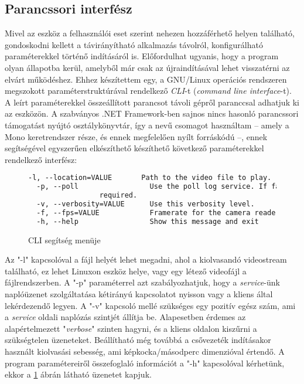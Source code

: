 \subsection{Parancssori interfész}

Mivel az eszköz a felhasználói eset szerint nehezen hozzáférhető helyen található, gondoskodni kellett a távirányítható alkalmazás távolról, konfigurálható paraméterekkel történő indításáról is. Előfordulhat ugyanis, hogy a program olyan állapotba kerül, amelyből már csak az újraindításával lehet visszatérni az elvárt működéshez. Ehhez készítettem egy, a GNU/Linux operációs rendszeren megszokott paraméterstruktúrával rendelkező \emph{CLI}-t (\emph{command line interface}-t). A leírt paraméterekkel összeállított parancsot távoli gépről  paranccsal adhatjuk ki az eszközön. A szabványos .NET Framework-ben sajnos nincs hasonló parancssori támogatást nyújtó osztálykönyvtár, így a   nevű csomagot használtam -- amely a Mono keretrendszer része, és ennek megfelelően nyílt forráskódú --, ennek segítségével egyszerűen elkészíthető készíthető következő paraméterekkel rendelkező interfész:

\begin{figure}[h]
\centering
\begin{minipage}{1\textwidth}
\begin{mdframed}[backgroundcolor=gray!20]
\begin{scriptsize}
\begin{lstlisting}[language=xml]
  -l, --location=VALUE       Path to the video file to play.
  -p, --poll                 Use the poll log service. If false, duplex binding is
  			     required.
  -v, --verbosity=VALUE      Use this verbosity level.
  -f, --fps=VALUE            Framerate for the camera reader.
  -h, --help                 Show this message and exit
\end{lstlisting}
\end{scriptsize}
\end{mdframed}
\end{minipage}
\caption{CLI segítség menüje} \label{figure:cli_help}
\end{figure}

Az "-l" kapcsolóval a fájl helyét lehet megadni, ahol a kiolvasandó videostream található, ez lehet Linuxon eszköz helye, vagy egy létező videofájl a fájlrendszerben.
A "-p" paraméterrel azt szabályozhatjuk, hogy a \emph{service}-ünk naplóüzenet szolgáltatása kétirányú kapcsolatot nyisson vagy a kliens által lekérdezendő legyen.
A "-v" kapcsoló mellé szükséges egy pozitív egész szám, ami a \emph{service} oldali naplózás szintjét állítja be. Alapesetben érdemes az alapértelmezett "\emph{verbose}" szinten hagyni, és a kliens oldalon kiszűrni a szükségtelen üzeneteket. 
Beállítható még továbbá a csővezeték indításakor használt kiolvasási sebesség, ami képkocka/másodperc dimenzióval értendő.
A program paramétereiről összefoglaló információt a "-h" kapcsolóval kérhetünk, ekkor a \ref{figure:cli_help} ábrán látható üzenetet kapjuk.

